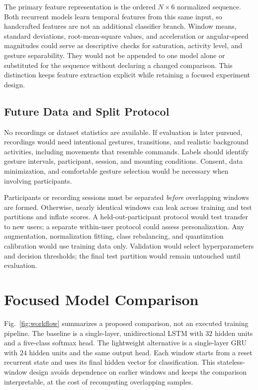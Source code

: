 \documentclass[conference]{IEEEtran}
\begin{document}
The primary feature representation is the ordered $N\times6$ normalized sequence. Both recurrent models learn temporal features from this same input, so handcrafted features are not an additional classifier branch. Window means, standard deviations, root-mean-square values, and acceleration or angular-speed magnitudes could serve as descriptive checks for saturation, activity level, and gesture separability. They would not be appended to one model alone or substituted for the sequence without declaring a changed comparison. This distinction keeps feature extraction explicit while retaining a focused experiment design.

\subsection{Future Data and Split Protocol}
No recordings or dataset statistics are available. If evaluation is later pursued, recordings would need intentional gestures, transitions, and realistic background activities, including movements that resemble commands. Labels should identify gesture intervals, participant, session, and mounting conditions. Consent, data minimization, and comfortable gesture selection would be necessary when involving participants.

Participants or recording sessions must be separated \emph{before} overlapping windows are formed. Otherwise, nearly identical windows can leak across training and test partitions and inflate scores. A held-out-participant protocol would test transfer to new users; a separate within-user protocol could assess personalization. Any augmentation, normalization fitting, class rebalancing, and quantization calibration would use training data only. Validation would select hyperparameters and decision thresholds; the final test partition would remain untouched until evaluation.

\section{Focused Model Comparison}
Fig.~\ref{fig:workflow} summarizes a proposed comparison, not an executed training pipeline. The baseline is a single-layer, unidirectional LSTM with $32$ hidden units and a five-class softmax head. The lightweight alternative is a single-layer GRU with $24$ hidden units and the same output head. Each window starts from a reset recurrent state and uses its final hidden vector for classification. This stateless-window design avoids dependence on earlier windows and keeps the comparison interpretable, at the cost of recomputing overlapping samples.
\end{document}
